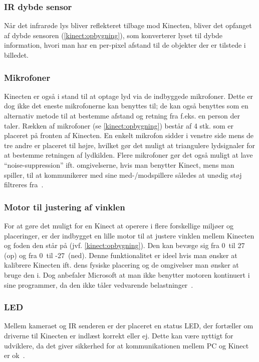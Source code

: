 \subsubsection{IR dybde sensor}
Når det infrarøde lys bliver reflekteret tilbage mod Kinecten, bliver det opfanget af dybde sensoren (\cref{kinect:opbygning}), som konverterer lyset til dybde information, hvori man har en per-pixel afstand til de objekter der er tilstede i billedet.

\subsubsection{Mikrofoner}
Kinecten er også i stand til at optage lyd via de indbyggede mikrofoner.
Dette er dog ikke det eneste mikrofonerne kan benyttes til; de kan også benyttes som en alternativ metode til at bestemme afstand og retning fra f.eks. en person der taler.
Rækken af mikrofoner (se \cref{kinect:opbygning}) består af 4 stk. som er placeret på fronten af Kinecten.
En enkelt mikrofon sidder i venstre side mens de tre andre er placeret til højre, hvilket gør det muligt at triangulere lydsignaler for at bestemme retningen af lydkilden.
Flere mikrofoner gør det også muligt at lave ``noise-suppression'' ift. omgivelserne, hvis man benytter Kinect, mens man spiller, til at kommunikerer med sine med-/modspillere således at unødig støj filtreres fra~\cite[s.~15]{kinectProgrammingGuide}.

\subsubsection{Motor til justering af vinklen}
For at gøre det muligt for en Kinect at operere i flere forskellige miljøer og placeringer, er der indbygget en lille motor til at justere vinklen mellem Kinecten og foden den står på (jvf. \cref{kinect:opbygning}).
Den kan bevæge sig fra 0\degree~til 27\degree~ (op) og fra 0\degree~til -27\degree~(ned).
Denne funktionalitet er ideel hvis man ønsker at kalibrere Kinecten ift. dens fysiske placering og de omgivelser man ønsker at bruge den i.
Dog anbefaler Microsoft at man ikke benytter motoren kontinuert i sine programmer, da den ikke tåler vedvarende belastninger~\cite{kinectDocElevationAngle}.

\subsubsection{LED}
Mellem kameraet og IR senderen er der placeret en status LED, der fortæller om driverne til Kinecten er indlæst korrekt eller ej.
Dette kan være nyttigt for udviklere, da det giver sikkerhed for at kommunikationen mellem PC og Kinect er ok~\cite[s.~15]{kinectProgrammingGuide}.

